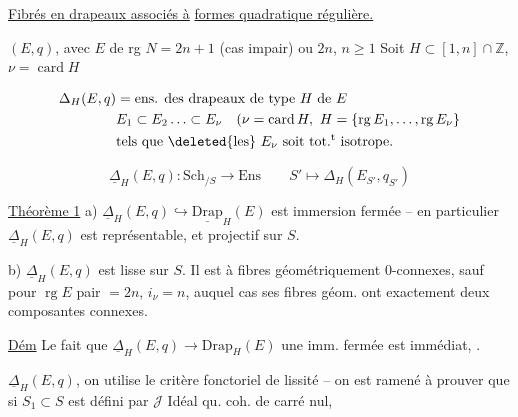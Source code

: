 
\uline{Fibrés en drapeaux associés à} \uline{formes quadratique régulière.}

$(E,q)$, avec $E$ de rg $N=2n+1$ (cas impair) ou $2n$, $n\geq1$  Soit $H\subset[1,n]\cap\mathbb Z$,   $\nu=\operatorname{card}H$

\[
 \begin{aligned}
 \Delta_H(E,q)&=\text{ens. des drapeaux de type }H\text{ de }E\\
 &E_1\subset E_2\ldots\subset E_\nu\quad(\nu=\operatorname{card} H,\ H=\{\operatorname{rg} E_1,\ldots,\operatorname{rg} E_\nu\}\\
 &\text{tels que }\deleted{\text{les}}\ E_\nu\text{ soit tot.}^{\mathrm t}\text{ isotrope.}
 \end{aligned}
\]

\[
 \underline\Delta_H(E,q):\mathrm{Sch}_{/S}\longrightarrow\mathrm{Ens}\qquad S'\longmapsto\Delta_H(E_{S'},q_{S'})
\]

\uline{Théorème 1} a) $\underline\Delta_H(E,q)\hookrightarrow\underline{\mathrm{Drap}}_H(E)$ est   immersion fermée -- en particulier $\underline\Delta_H(E,q)$ est représentable, et projectif sur $S$.

b) $\underline\Delta_H(E,q)$ est lisse sur $S$. Il est à fibres géométriquement $0$-connexes, sauf pour  $\operatorname{rg}E$ pair $=2n$, $i_\nu=n$, auquel cas  ses fibres géom. ont exactement deux composantes connexes.


\uline{Dém} Le fait que $\underline\Delta_H(E,q)\to\mathrm{Drap}_H(E)$ une imm. fermée est immédiat,  .

 $\underline\Delta_H(E,q)$, on utilise le critère fonctoriel de lissité -- on est ramené à prouver que si $S_1\subset S$ est défini par $\mathcal J$ Idéal qu. coh. de carré nul,

